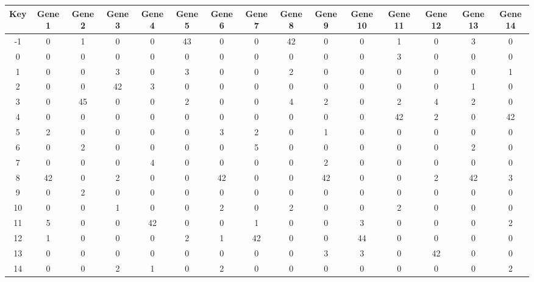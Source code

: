 \begin{tabular}{|c|c|c|c|c|c|c|c|c|c|c|c|c|c|c|}
\hline
Key & Gene 1 & Gene 2 & Gene 3 & Gene 4 & Gene 5 & Gene 6 & Gene 7 & Gene 8 & Gene 9 & Gene 10 & Gene 11 & Gene 12 & Gene 13 & Gene 14 \\
\hline
-1 & 0 & 1 & 0 & 0 & 43 & 0 & 0 & 42 & 0 & 0 & 1 & 0 & 3 & 0 \\
0 & 0 & 0 & 0 & 0 & 0 & 0 & 0 & 0 & 0 & 0 & 3 & 0 & 0 & 0 \\
1 & 0 & 0 & 3 & 0 & 3 & 0 & 0 & 2 & 0 & 0 & 0 & 0 & 0 & 1 \\
2 & 0 & 0 & 42 & 3 & 0 & 0 & 0 & 0 & 0 & 0 & 0 & 0 & 1 & 0 \\
3 & 0 & 45 & 0 & 0 & 2 & 0 & 0 & 4 & 2 & 0 & 2 & 4 & 2 & 0 \\
4 & 0 & 0 & 0 & 0 & 0 & 0 & 0 & 0 & 0 & 0 & 42 & 2 & 0 & 42 \\
5 & 2 & 0 & 0 & 0 & 0 & 3 & 2 & 0 & 1 & 0 & 0 & 0 & 0 & 0 \\
6 & 0 & 2 & 0 & 0 & 0 & 0 & 5 & 0 & 0 & 0 & 0 & 0 & 2 & 0 \\
7 & 0 & 0 & 0 & 4 & 0 & 0 & 0 & 0 & 2 & 0 & 0 & 0 & 0 & 0 \\
8 & 42 & 0 & 2 & 0 & 0 & 42 & 0 & 0 & 42 & 0 & 0 & 2 & 42 & 3 \\
9 & 0 & 2 & 0 & 0 & 0 & 0 & 0 & 0 & 0 & 0 & 0 & 0 & 0 & 0 \\
10 & 0 & 0 & 1 & 0 & 0 & 2 & 0 & 2 & 0 & 0 & 2 & 0 & 0 & 0 \\
11 & 5 & 0 & 0 & 42 & 0 & 0 & 1 & 0 & 0 & 3 & 0 & 0 & 0 & 2 \\
12 & 1 & 0 & 0 & 0 & 2 & 1 & 42 & 0 & 0 & 44 & 0 & 0 & 0 & 0 \\
13 & 0 & 0 & 0 & 0 & 0 & 0 & 0 & 0 & 3 & 3 & 0 & 42 & 0 & 0 \\
14 & 0 & 0 & 2 & 1 & 0 & 2 & 0 & 0 & 0 & 0 & 0 & 0 & 0 & 2 \\
\hline
\end{tabular}